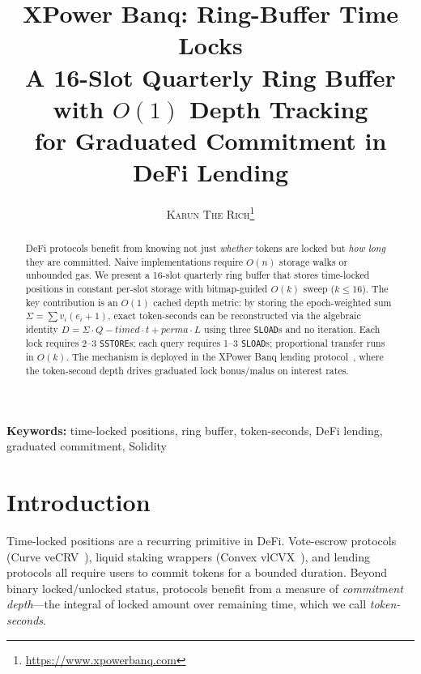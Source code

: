 \documentclass[10pt,a4paper,twocolumn]{article}
\title{\textbf{\Large XPower Banq: Ring-Buffer Time Locks}\\[0.3em]
\normalsize A 16-Slot Quarterly Ring Buffer with $O(1)$ Depth Tracking\\
for Graduated Commitment in DeFi Lending}
\author{
    \textsc{Karun The Rich}\thanks{\url{https://www.xpowerbanq.com}}
}
\date{}
\theoremstyle{definition}
\theoremstyle{plain}
\theoremstyle{remark}
\begin{document}
\maketitle


\begin{abstract}
DeFi protocols benefit from knowing not just \emph{whether} tokens are locked but \emph{how long} they are committed. Naive implementations require $O(n)$ storage walks or unbounded gas. We present a 16-slot quarterly ring buffer that stores time-locked positions in constant per-slot storage with bitmap-guided $O(k)$ sweep ($k\leq 16$). The key contribution is an $O(1)$ cached depth metric: by storing the epoch-weighted sum $\Sigma = \sum v_i(e_i{+}1)$, exact token-seconds can be reconstructed via the algebraic identity $D = \Sigma \cdot Q - \mathit{timed}\cdot t + \mathit{perma}\cdot L$ using three \texttt{SLOAD}s and no iteration. Each lock requires 2--3 \texttt{SSTORE}s; each query requires 1--3 \texttt{SLOAD}s; proportional transfer runs in $O(k)$. The mechanism is deployed in the XPower Banq lending protocol~\cite{wp}, where the token-second depth drives graduated lock bonus/malus on interest rates.
\end{abstract}

\textbf{Keywords:} time-locked positions, ring buffer, token-seconds, DeFi lending, graduated commitment, Solidity

\section{Introduction}
\label{sec:introduction}

Time-locked positions are a recurring primitive in DeFi. Vote-escrow protocols (Curve veCRV~\cite{curve}), liquid staking wrappers (Convex vlCVX~\cite{convex}), and lending protocols all require users to commit tokens for a bounded duration. Beyond binary locked/unlocked status, protocols benefit from a measure of \emph{commitment depth}---the integral of locked amount over remaining time, which we call \emph{token-seconds}.
\end{document}
